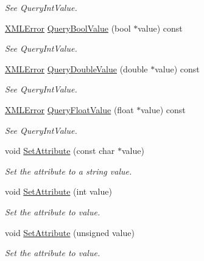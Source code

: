 \begin{DoxyCompactItemize}
\begin{DoxyCompactList}\small\item\em See Query\+Int\+Value. \end{DoxyCompactList}\item 
\hyperlink{namespacetinyxml2_a1fbf88509c3ac88c09117b1947414e08}{X\+M\+L\+Error} \hyperlink{classtinyxml2_1_1_x_m_l_attribute_a5f32e038954256f61c21ff20fd13a09c}{Query\+Bool\+Value} (bool $\ast$value) const
\begin{DoxyCompactList}\small\item\em See Query\+Int\+Value. \end{DoxyCompactList}\item 
\hyperlink{namespacetinyxml2_a1fbf88509c3ac88c09117b1947414e08}{X\+M\+L\+Error} \hyperlink{classtinyxml2_1_1_x_m_l_attribute_a2aa6e55e8ea03af0609cf6690bff79b9}{Query\+Double\+Value} (double $\ast$value) const
\begin{DoxyCompactList}\small\item\em See Query\+Int\+Value. \end{DoxyCompactList}\item 
\hyperlink{namespacetinyxml2_a1fbf88509c3ac88c09117b1947414e08}{X\+M\+L\+Error} \hyperlink{classtinyxml2_1_1_x_m_l_attribute_a049dea6449a6259b6cfed44a9427b607}{Query\+Float\+Value} (float $\ast$value) const
\begin{DoxyCompactList}\small\item\em See Query\+Int\+Value. \end{DoxyCompactList}\item 
void \hyperlink{classtinyxml2_1_1_x_m_l_attribute_a406d2c4a13c7af99a65edb59dd9f7581}{Set\+Attribute} (const char $\ast$value)
\begin{DoxyCompactList}\small\item\em Set the attribute to a string value. \end{DoxyCompactList}\item 
void \hyperlink{classtinyxml2_1_1_x_m_l_attribute_ad86d7d7058d76761c3a80662566a57e5}{Set\+Attribute} (int value)
\begin{DoxyCompactList}\small\item\em Set the attribute to value. \end{DoxyCompactList}\item 
void \hyperlink{classtinyxml2_1_1_x_m_l_attribute_ae70468c0f6df2748ba3529c716999fae}{Set\+Attribute} (unsigned value)
\begin{DoxyCompactList}\small\item\em Set the attribute to value. \end{DoxyCompactList}\item 

\end{DoxyCompactItemize}

